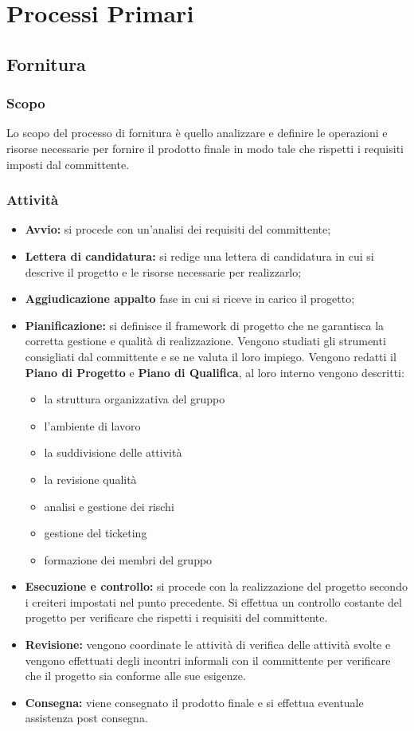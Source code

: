 \section{Processi Primari}
\subsection{Fornitura}
\subsubsection{Scopo}
Lo scopo del processo di fornitura è quello analizzare e definire le operazioni e risorse necessarie per fornire il prodotto finale in modo tale che rispetti i requisiti imposti dal committente.
\subsubsection{Attività}
\begin{itemize}
    \item \textbf{Avvio:} si procede con un'analisi dei requisiti del committente;
    \item \textbf{Lettera di candidatura:} si redige una lettera di candidatura in cui si descrive il progetto e le risorse necessarie per realizzarlo;
    \item \textbf{Aggiudicazione appalto} fase in cui si riceve in carico il progetto;
    \item \textbf{Pianificazione:} si definisce il framework di progetto che ne garantisca la corretta gestione e qualità di realizzazione. Vengono studiati gli strumenti consigliati dal committente e se ne valuta il loro impiego. Vengono redatti il \textbf{Piano di Progetto} e \textbf{Piano di Qualifica}, al loro interno vengono descritti:
    \begin{itemize}
        \item {la struttura organizzativa del gruppo}\item {l'ambiente di lavoro}
        \item {la suddivisione delle attività}
        \item {la revisione qualità}
        \item {analisi e gestione dei rischi}
        \item {gestione del ticketing}
        \item {formazione dei membri del gruppo}
\end{itemize}
    \item \textbf{Esecuzione e controllo:} si procede con la realizzazione del progetto secondo i creiteri impostati nel punto precedente. Si effettua un controllo costante del progetto per verificare che rispetti i requisiti del committente.
    \item \textbf{Revisione:} vengono coordinate le attività di verifica delle attività svolte e vengono effettuati degli incontri informali con il committente per verificare che il progetto sia conforme alle sue esigenze.
    \item \textbf{Consegna:} viene consegnato il prodotto finale e si effettua eventuale assistenza post consegna.
\end{itemize}

